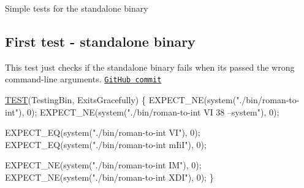 Simple tests for the standalone binary

\subsection*{First test -\/ standalone binary }

This test just checks if the standalone binary fails when it\textquotesingle{}s passed the wrong command-\/line arguments. \href{https://github.com/diogenes1oliveira/libroman/commit/2430213c9b1377f093efbf6c92b445bf09657653#diff-b71fb74c402a09fc46ed4e34ffe34e75}{\tt Git\+Hub commit}


\begin{DoxyCodeInclude}
\hyperlink{test_simple_8c_aff9fa977573ddab7597e233f1775d7c5}{TEST}(TestingBin, ExitsGracefully) \{
    EXPECT\_NE(system(\textcolor{stringliteral}{"./bin/roman-to-int"}), 0);
    EXPECT\_NE(system(\textcolor{stringliteral}{"./bin/roman-to-int VI 38 --system"}), 0);
    
    EXPECT\_EQ(system(\textcolor{stringliteral}{"./bin/roman-to-int VI"}), 0);
    EXPECT\_EQ(system(\textcolor{stringliteral}{"./bin/roman-to-int mIiI"}), 0);
    
    EXPECT\_NE(system(\textcolor{stringliteral}{"./bin/roman-to-int IM"}), 0);
    EXPECT\_NE(system(\textcolor{stringliteral}{"./bin/roman-to-int XDI"}), 0);
\}
\end{DoxyCodeInclude}
